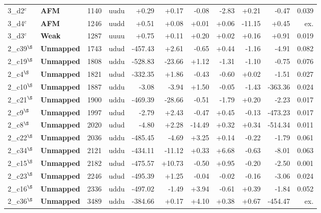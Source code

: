 {\begin{longtable}{@{\extracolsep{\fill}}llrlrrrrrrr@{}}
3\_d2$^{c}$ & \textcolor{famAFM}{\textbf{AFM}} & 1140 & uudu & +0.29 & +0.17 & -0.08 & -2.83 & +0.21 & -0.47 & 0.039 \\
3\_d4$^{c}$ & \textcolor{famAFM}{\textbf{AFM}} & 1246 & uudd & +0.51 & +0.08 & +0.01 & +0.06 & -11.15 & +0.45 & ex. \\
3\_d3$^{c}$ & \textcolor{famWeak}{\textbf{Weak}} & 1287 & uuuu & +0.75 & +0.11 & +0.20 & +0.02 & +0.16 & +0.91 & 0.019 \\
2\_c39$^{\S}$ & \textcolor{famUnmapped}{\textbf{Unmapped}} & 1743 & udud & -457.43 & +2.61 & -0.65 & +0.44 & -1.16 & -4.91 & 0.082 \\
2\_c19$^{\S}$ & \textcolor{famUnmapped}{\textbf{Unmapped}} & 1808 & uddu & -528.83 & -23.66 & +1.12 & -1.31 & -1.10 & -0.75 & 0.076 \\
2\_c4$^{\S}$ & \textcolor{famUnmapped}{\textbf{Unmapped}} & 1821 & udud & -332.35 & +1.86 & -0.43 & -0.60 & +0.02 & -1.51 & 0.027 \\
2\_c10$^{\S}$ & \textcolor{famUnmapped}{\textbf{Unmapped}} & 1887 & uddu & -3.08 & -3.94 & +1.50 & -0.05 & -1.43 & -363.36 & 0.024 \\
2\_c21$^{\S}$ & \textcolor{famUnmapped}{\textbf{Unmapped}} & 1900 & uddu & -469.39 & -28.66 & -0.51 & -1.79 & +0.20 & -2.23 & 0.017 \\
2\_c9$^{\S}$ & \textcolor{famUnmapped}{\textbf{Unmapped}} & 1997 & udud & -2.79 & +2.43 & -0.47 & +0.45 & -0.13 & -473.23 & 0.017 \\
2\_c8$^{\S}$ & \textcolor{famUnmapped}{\textbf{Unmapped}} & 2020 & udud & -4.80 & +2.28 & -14.49 & +0.32 & +0.34 & -514.34 & 0.011 \\
2\_c22$^{\S}$ & \textcolor{famUnmapped}{\textbf{Unmapped}} & 2036 & uddu & -485.45 & -4.69 & +3.25 & +0.14 & -0.22 & -1.79 & 0.061 \\
2\_c34$^{\S}$ & \textcolor{famUnmapped}{\textbf{Unmapped}} & 2121 & uddu & -434.11 & -11.12 & +0.33 & +6.68 & -0.63 & -8.01 & 0.063 \\
2\_c15$^{\S}$ & \textcolor{famUnmapped}{\textbf{Unmapped}} & 2182 & udud & -475.57 & +10.73 & -0.50 & +0.95 & -0.20 & -2.50 & 0.001 \\
2\_c23$^{\S}$ & \textcolor{famUnmapped}{\textbf{Unmapped}} & 2246 & udud & -495.39 & +1.25 & -0.04 & -0.02 & -0.16 & -3.06 & 0.024 \\
2\_c16$^{\S}$ & \textcolor{famUnmapped}{\textbf{Unmapped}} & 2336 & uddu & -497.02 & -1.49 & +3.94 & -0.61 & +0.39 & -1.84 & 0.052 \\
2\_c36$^{\S}$ & \textcolor{famUnmapped}{\textbf{Unmapped}} & 3489 & uddu & -384.66 & +0.17 & +4.10 & +0.38 & +0.67 & -454.47 & ex. \\

\end{longtable}}
